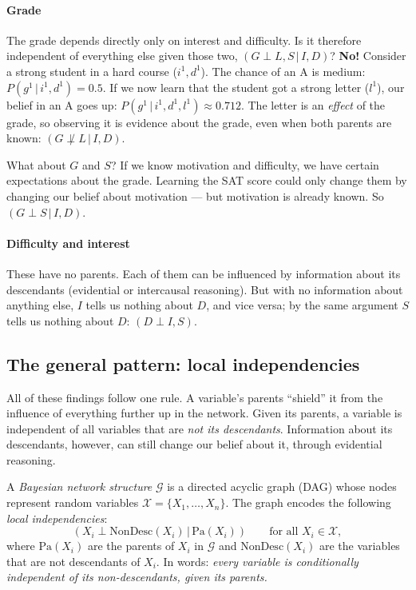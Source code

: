 \documentclass[11pt, oneside]{book}
\newcommand{\Prob}{\mathbb{P}}           %
\newcommand{\given}{\,\vert\,}           %
\newcommand{\Pa}{\mathrm{Pa}}            %
\newcommand{\NonDesc}{\mathrm{NonDesc}}  %
\newcommand{\indep}{\perp}               %
\newcommand{\nindep}{\not\perp}          %
\newcommand{\Xall}{\mathcal{X}}          %
\let\originalsubsection\subsection
\renewcommand{\subsection}{\Needspace{6\baselineskip}\originalsubsection}
\begin{document}
\paragraph{Grade} The grade depends directly only on interest and difficulty.
Is it therefore independent of everything else given those two,
$(G \indep L, S \given I, D)$? \textbf{No!} Consider a strong student in a
hard course ($i^1, d^1$). The chance of an A is medium: $P(g^1 \given i^1, d^1)
= 0.5$. If we now learn that the student got a strong letter ($l^1$), our
belief in an A goes up: $P(g^1 \given i^1, d^1, l^1) \approx 0.712$. The
letter is an \emph{effect} of the grade, so observing it is evidence about the
grade, even when both parents are known: $(G \nindep L \given I, D)$.

What about $G$ and $S$? If we know motivation and difficulty, we have certain
expectations about the grade. Learning the SAT score could only change them by
changing our belief about motivation --- but motivation is already known. So
$(G \indep S \given I, D)$.

\paragraph{Difficulty and interest} These have no parents. Each of them can be
influenced by information about its descendants (evidential or intercausal
reasoning). But with no information about anything else, $I$ tells us nothing
about $D$, and vice versa; by the same argument $S$ tells us nothing about
$D$: $(D \indep I, S)$.

\subsection{The general pattern: local independencies}

All of these findings follow one rule. A variable's parents ``shield'' it from
the influence of everything further up in the network. Given its parents, a
variable is independent of all variables that are \emph{not its descendants}.
Information about its descendants, however, can still change our belief about
it, through evidential reasoning.

\begin{defbox}[title={Bayesian network structure (part I of the definition)}]
A \emph{Bayesian network structure} $\mathcal{G}$ is a directed acyclic graph
(DAG) whose nodes represent random variables $\Xall = \{X_1, \ldots, X_n\}$.
The graph encodes the following \emph{local independencies}:
\[
  (X_i \indep \NonDesc(X_i) \given \Pa(X_i)) \qquad\text{for all } X_i \in \Xall,
\]
where $\Pa(X_i)$ are the parents of $X_i$ in $\mathcal{G}$ and
$\NonDesc(X_i)$ are the variables that are not descendants of $X_i$.
In words: \emph{every variable is conditionally independent of its
non-descendants, given its parents.}
\end{defbox}
\end{document}

